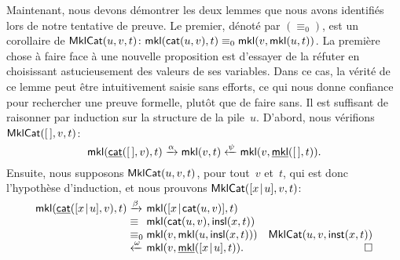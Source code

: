 Maintenant, nous devons démontrer les deux lemmes que nous avons
identifiés lors de notre tentative de preuve. Le premier, dénoté par
\((\equiv_0)\), est un corollaire de 
\(\textsf{MklCat}({u,v,t}) \colon \textsf{mkl}(\textsf{cat}(u,v),t) \equiv_0
\textsf{mkl}(v,\textsf{mkl}(u,t))\). La première chose à faire face à une
nouvelle proposition est d'essayer de la réfuter en choisissant
astucieusement des valeurs de ses variables. Dans ce cas, la vérité de
ce lemme peut être intuitivement saisie sans efforts, ce qui nous
donne confiance pour rechercher une preuve formelle, plutôt que de
faire sans. Il est suffisant de raisonner par induction sur la
structure de la pile~\(u\). D'abord, nous vérifions
\(\textsf{MklCat}({[\,],v,t})\):
\begin{equation*}
\textsf{mkl}(\underline{\textsf{cat}}([\,],v),t)
  \xrightarrow{\smash{\alpha}} \textsf{mkl}(v,t)
  \xleftarrow{\smash{\psi}} \textsf{mkl}(v, \underline{\textsf{mkl}}([\,],t)).
\end{equation*}
Ensuite, nous supposons \(\textsf{MklCat}({u,v,t})\), pour tout~\(v\)
et~\(t\), qui est donc l'hypothèse d'induction, et nous prouvons
\(\textsf{MklCat}({[{x}\!\mid\!{u}],v,t})\):
\begin{equation*}
  \begin{array}{@{}r@{\;}l@{\;}l@{\quad}r@{}}
  \fun{mkl}(\ufun{cat}(\cons{x}{u},v),t)
& \xrightarrow{\smash{\beta}} &
  \fun{mkl}(\cons{x}{\fun{cat}(u,v)},t)\\
& \equiv &
  \fun{mkl}(\fun{cat}(u,v),\fun{insl}(x,t))\\
& \equiv_0 & \fun{mkl}(v,\fun{mkl}(u,\fun{insl}(x,t)))
& \IH{\pred{MklCat}{u,v,\fun{inst}(x,t)}}\\
& \xleftarrow{\smash{\omega}} &
  \fun{mkl}(v,\ufun{mkl}(\cons{x}{u},t)). & \hfill\Box
\end{array}
\end{equation*}

